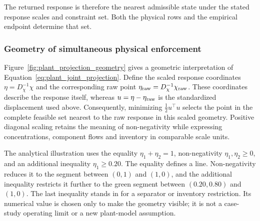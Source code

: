 The returned response is therefore the nearest admissible state under the stated response scales and constraint set. Both the physical rows and the empirical endpoint determine that set.

\subsubsection{Geometry of simultaneous physical enforcement}

Figure~\ref{fig:plant_projection_geometry} gives a geometric interpretation of Equation~\eqref{eq:plant_joint_projection}. Define the scaled response coordinates $\eta=D_\chi^{-1}\chi$ and the corresponding raw point $\eta_{\rm raw}=D_\chi^{-1}\chi_{\rm raw}$. These coordinates describe the response itself, whereas $u=\eta-\eta_{\rm raw}$ is the standardized displacement used above. Consequently, minimizing $\tfrac12u^\top u$ selects the point in the complete feasible set nearest to the raw response in this scaled geometry. Positive diagonal scaling retains the meaning of non-negativity while expressing concentrations, component flows and inventory in comparable scale units.

The analytical illustration uses the equality $\eta_1+\eta_2=1$, non-negativity $\eta_1,\eta_2\ge0$, and an additional inequality $\eta_1\ge0.20$. The equality defines a line. Non-negativity reduces it to the segment between $(0,1)$ and $(1,0)$, and the additional inequality restricts it further to the green segment between $(0.20,0.80)$ and $(1,0)$. The last inequality stands in for a separator or inventory restriction. Its numerical value is chosen only to make the geometry visible; it is not a case-study operating limit or a new plant-model assumption.

